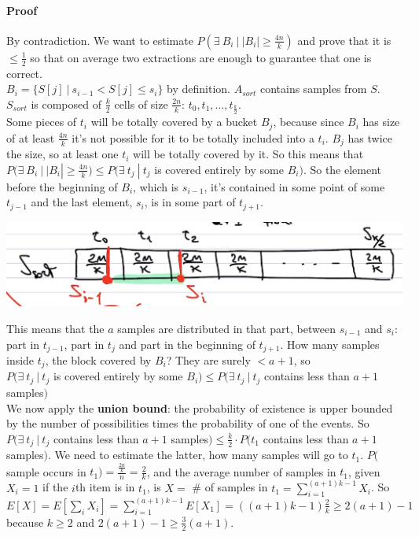 \documentclass[10pt]{report}
\begin{document}
\paragraph{Proof} By contradiction. We want to estimate $P(\exists\:B_i\:|\:|B_i|\geq \frac{4n}{k})$ and prove that it is $\leq \frac{1}{2}$ so that on average two extractions are enough to guarantee that one is correct.\\
$B_i = \{S[j]\:|\: s_{i-1} < S[j] \leq s_i\}$ by definition. $A_{sort}$  contains samples from $S$.\\
$S_{sort}$ is composed of $\frac{k}{2}$ cells of size $\frac{2n}{k}$: $t_0, t_1, \ldots, t_\frac{k}{2}$.\\
Some pieces of $t_i$ will be totally covered by a bucket $B_j$, because since $B_i$ has size of at least $\frac{4n}{k}$ it's not possible for it to be totally included into a $t_i$. $B_j$ has twice the size, so at least one $t_i$ will be totally covered by it. So this means that $P(\exists\:B_i\:|\:|B_i|\geq \frac{4n}{k}) \leq P(\exists\: t_j\:|\: t_j$ is covered entirely by some $B_i)$. So the element before the beginning of $B_i$, which is $s_{i-1}$, it's contained in some point of some $t_{j-1}$ and the last element, $s_i$, is in some part of $t_{j+1}$.
\begin{center}
	\includegraphics[scale=0.75]{4.png}
\end{center}
This means that the $a$ samples are distributed in that part, between $s_{i-1}$ and $s_i$: part in $t_{j-1}$, part in $t_j$ and part in the beginning of $t_{j+1}$. How many samples inside $t_j$, the block covered by $B_i$? They are surely $< a+1$, so\\$P(\exists\: t_j\:|\: t_j$ is covered entirely by some $B_i) \leq P(\exists\:t_j\:|\:t_j$ contains less than $a+1$ samples$)$\\
We now apply the \textbf{union bound}: the probability of existence is upper bounded by the number of possibilities times the probability of one of the events. So $P(\exists\:t_j\:|\:t_j$ contains less than $a+1$ samples$) \leq \frac{k}{2}\cdot P(t_1$ contains less than $a+1$ samples$)$. We need to estimate the latter, how many samples will go to $t_1$. $P($sample occurs in $t_1) = \frac{\frac{2n}{k}}{n} = \frac{2}{k}$, and the average number of samples in $t_1$, given $X_i = 1$ if the $i$th item is in $t_1$, is $X =$ \# of samples in $t_1 = \sum_{i = 1}^{(a+1)k - 1} X_i$. So $E[X] = E[\sum_i X_i] = \sum_{i = 1}^{(a+1)k - 1} E[X_1] = ((a+1)k - 1)\frac{2}{k} \geq 2(a+1) - 1$ because $k \geq 2$ and $2(a+1) - 1 \geq \frac{3}{2}(a+1)$.\\
\end{document}
